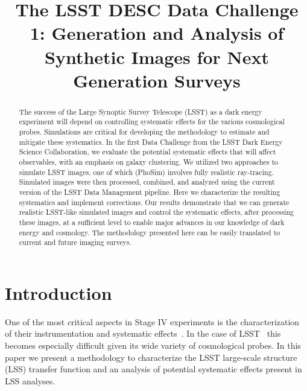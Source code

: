 \documentclass[\docopts]{\docclass}
\begin{document}
\title{ The LSST DESC Data Challenge 1: Generation and Analysis of Synthetic Images for Next Generation Surveys }

\maketitlepre

\begin{abstract}

The success of the Large Synoptic Survey Telescope (LSST) as a dark energy experiment will depend on controlling systematic effects for the various cosmological probes.  Simulations are critical for developing the methodology to estimate and mitigate these systematics.  In the first Data Challenge from the LSST Dark Energy Science Collaboration, we evaluate the potential systematic effects that will affect observables, with an emphasis on galaxy clustering.  We utilized two approaches to simulate LSST images, one of which (PhoSim) involves fully realistic ray-tracing.  Simulated images were then processed, combined, and analyzed using the current version of the LSST Data Management pipeline.  Here we characterize the resulting systematics and implement corrections.  Our results demonstrate that we can generate realistic LSST-like simulated images and control the systematic effects, after processing these images, at a sufficient level to enable major advances in our knowledge of dark energy and cosmology. The methodology presented here can be easily translated to current and future imaging surveys.
\end{abstract}


\maketitlepost

%

\section{Introduction}
\label{sec:intro}

One of the most critical aspects in Stage IV experiments is the characterization of their instrumentation and systematic effects~\citep{2006astro.ph..9591A}. In the case of  LSST~\citep{Overview,ScienceBook,WhitePaper} this becomes especially difficult given its wide variety of cosmological probes. In this paper we present a methodology to characterize the LSST large-scale structure (LSS) transfer function and an analysis of potential systematic effects present in LSS analyses.
\end{document}
